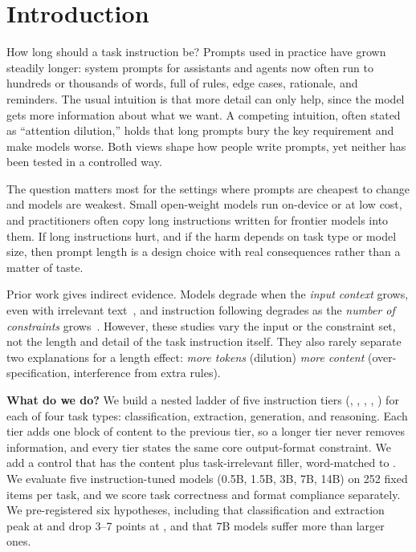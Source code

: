 \section{Introduction}
\label{sec:intro}

How long should a task instruction be?
Prompts used in practice have grown steadily longer: system prompts for assistants and agents now often run to hundreds or thousands of words, full of rules, edge cases, rationale, and reminders.
The usual intuition is that more detail can only help, since the model gets more information about what we want.
A competing intuition, often stated as ``attention dilution,'' holds that long prompts bury the key requirement and make models worse.
Both views shape how people write prompts, yet neither has been tested in a controlled way.

The question matters most for the settings where prompts are cheapest to change and models are weakest.
Small open-weight models run on-device or at low cost, and practitioners often copy long instructions written for frontier models into them.
If long instructions hurt, and if the harm depends on task type or model size, then prompt length is a design choice with real consequences rather than a matter of taste.

Prior work gives indirect evidence.
Models degrade when the \emph{input context} grows, even with irrelevant text~\citep{shi2023distracted,liu2024lost,levy2024same}, and instruction following degrades as the \emph{number of constraints} grows~\citep{zhou2023ifeval,jiang2024followbench}.
However, these studies vary the input or the constraint set, not the length and detail of the task instruction itself.
They also rarely separate two explanations for a length effect: \emph{more tokens} (dilution) \versus \emph{more content} (over-specification, interference from extra rules).

{\bf What do we do?}
We build a nested ladder of five instruction tiers (\minimal, \concise, \standard, \detailed, \exhaustive) for each of four task types: classification, extraction, generation, and reasoning.
Each tier adds one block of content to the previous tier, so a longer tier never removes information, and every tier states the same core output-format constraint.
We add a \padded control that has the \standard content plus task-irrelevant filler, word-matched to \exhaustive.
We evaluate five instruction-tuned \qwen models (0.5B, 1.5B, 3B, 7B, 14B) on 252 fixed items per task, and we score task correctness and format compliance separately.
We pre-registered six hypotheses, including that classification and extraction peak at \standard and drop 3--7 points at \exhaustive, and that 7B models suffer more than larger ones.

